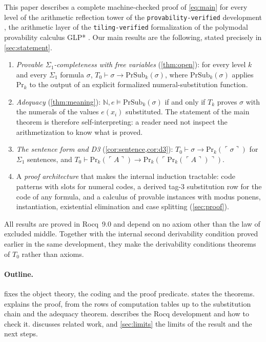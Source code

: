 \documentclass[11pt]{article}
\theoremstyle{plain}
\theoremstyle{definition}
\theoremstyle{remark}
\newcommand{\N}{\mathbb{N}}
\newcommand{\T}[1]{T_{#1}}
\newcommand{\Prv}{\mathrm{Pr}}
\newcommand{\gn}[1]{\ulcorner #1 \urcorner}
\newcommand{\PSub}{\mathrm{PrSub}}
\newcommand{\rocq}[1]{\texttt{#1}}
\newcommand{\sat}{\models}
\begin{document}
This paper describes a complete machine-checked proof of \eqref{eq:main}
for every level of the arithmetic reflection tower of the
\rocq{provability-verified} development \cite{ProvabilityVerified},
the arithmetic layer of the \rocq{tiling-verified} formalization of the
polymodal provability calculus GLP* \cite{TilingVerified}.  Our main
results are the following, stated precisely in \cref{sec:statement}.
\begin{enumerate}
  \item \emph{Provable $\Sigma_1$-completeness with free variables}
    (\cref{thm:open}): for every level $k$ and every $\Sigma_1$ formula
    $\sigma$, $\T0 \vdash \sigma \to \PSub_k(\sigma)$, where
    $\PSub_k(\sigma)$ applies $\Prv_k$ to the output of an explicit
    formalized numeral-substitution function.
  \item \emph{Adequacy} (\cref{thm:meaning}): $\N, e \sat \PSub_k(\sigma)$
    if and only if $\T{k}$ proves $\sigma$ with the numerals of the
    values $e(x_i)$ substituted.  The statement of the main theorem is
    therefore self-interpreting: a reader need not inspect the
    arithmetization to know what is proved.
  \item \emph{The sentence form and D3} (\cref{cor:sentence,cor:d3}):
    $\T0 \vdash \sigma \to \Prv_k(\gn{\sigma})$ for $\Sigma_1$ sentences,
    and $\T0 \vdash \Prv_k(\gn{A}) \to \Prv_k(\gn{\Prv_k(\gn{A})})$.
  \item A \emph{proof architecture} that makes the internal induction
    tractable: code patterns with slots for numeral codes, a derived
    tag-3 substitution row for the code of any formula, and a calculus
    of provable instances with modus ponens, instantiation, existential
    elimination and case splitting (\cref{sec:proof}).
\end{enumerate}
All results are proved in Rocq~9.0 and depend on no axiom other than
the law of excluded middle.  Together with the internal second
derivability condition proved earlier in the same development, they
make the derivability conditions theorems of $\T0$ rather than axioms.

\paragraph{Outline.}
 fixes the object theory, the coding and the proof
predicate.   states the theorems.
 explains the proof, from the rows of computation tables
up to the substitution chain and the adequacy theorem.
 describes the Rocq development and how to check it.
 discusses related work, and \cref{sec:limits} the
limits of the result and the next steps.
\end{document}
